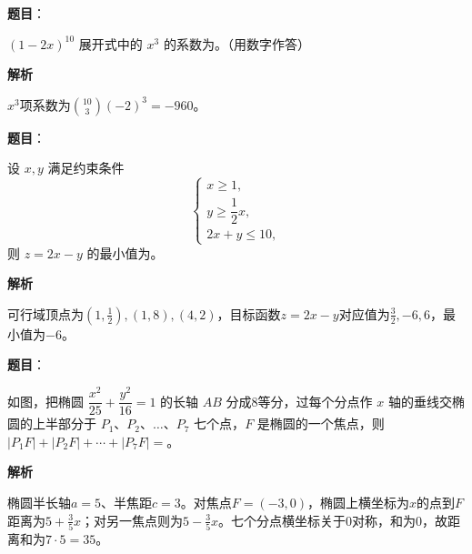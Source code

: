 \begin{answer}

\textbf{题目}：

$(1-2x)^{10}$ 展开式中的 $x^3$ 的系数为\gkblank{}。（用数字作答）

\textbf{解析}

$x^3$项系数为$\binom{10}{3}(-2)^3=-960$。


\end{answer}
\begin{answer}

\textbf{题目}：

设 $x,y$ 满足约束条件
\nopagebreak[4]
\[
\begin{cases}
x\geqslant1,\\
y\geqslant\dfrac12x,\\
2x+y\leqslant10,
\end{cases}
\]
则 $z=2x-y$ 的最小值为\gkblank{}。

\textbf{解析}

可行域顶点为$(1,\frac12),(1,8),(4,2)$，目标函数$z=2x-y$对应值为$\frac32,-6,6$，最小值为$-6$。


\end{answer}
\begin{answer}

\textbf{题目}：

如图，把椭圆 $\dfrac{x^2}{25}+\dfrac{y^2}{16}=1$ 的长轴 $AB$ 分成8等分，过每个分点作 $x$ 轴的垂线交椭圆的上半部分于 $P_1\text{、}P_2\text{、}\ldots\text{、}P_7$ 七个点，$F$ 是椭圆的一个焦点，则 $|P_1F|+|P_2F|+\cdots+|P_7F|=$\gkblank{}。
\nopagebreak[4]
\begin{center}\end{center}
\nopagebreak[4]
\textbf{解析}

椭圆半长轴$a=5$、半焦距$c=3$。对焦点$F=(-3,0)$，椭圆上横坐标为$x$的点到$F$距离为$5+\frac35x$；对另一焦点则为$5-\frac35x$。七个分点横坐标关于0对称，和为0，故距离和为$7\cdot5=35$。


\end{answer}
